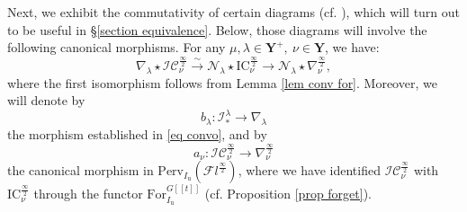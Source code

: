 \documentclass[11pt]{amsart}
\theoremstyle{plain}
\theoremstyle{remark}
\numberwithin{equation}{section}
\begin{document}
	Next, we exhibit the commutativity of certain diagrams (cf. \cite[(49),(50)]{ABBGM}), which will turn out to be useful in §\ref{section equivalence}. Below, those diagrams will involve the following canonical morphisms.  For any $\mu,\lambda\in\mathbf{Y}^+,~\nu\in\mathbf{Y}$, we have:
 \begin{equation}\label{eq can}
     \nabla_{\lambda}\star\mathcal{IC}^{\frac{\infty}{2}}_\nu\xrightarrow{\sim}\mathcal{N}_\lambda\star\mathrm{IC}^{\frac{\infty}{2}}_\nu\to\mathcal{N}_\lambda\star\nabla^{\frac{\infty}{2}}_\nu,
 \end{equation}
 where the first isomorphism follows from Lemma \ref{lem conv for}. Moreover, we will denote by 
$$b_\lambda:\mathcal{I}^{\lambda}_*\to \nabla_{\lambda}$$
the morphism established in \eqref{eq convo}, and by
$$a_\nu:\mathcal{IC}^{\frac{\infty}{2}}_\nu\to \nabla_{\nu}^{\frac{\infty}{2}} $$
the canonical morphism in $\mathrm{Perv}_{I_\mathrm{u}}(\mathcal{F}l^{\frac{\infty}{2}})$, where we have identified $\mathcal{IC}^{\frac{\infty}{2}}_\nu$ with $\mathrm{IC}^{\frac{\infty}{2}}_\nu$ through the functor $\mathrm{For}_{I_\mathrm{u}}^{G[[t]]}$ (cf. Proposition \ref{prop forget}).
\end{document}
